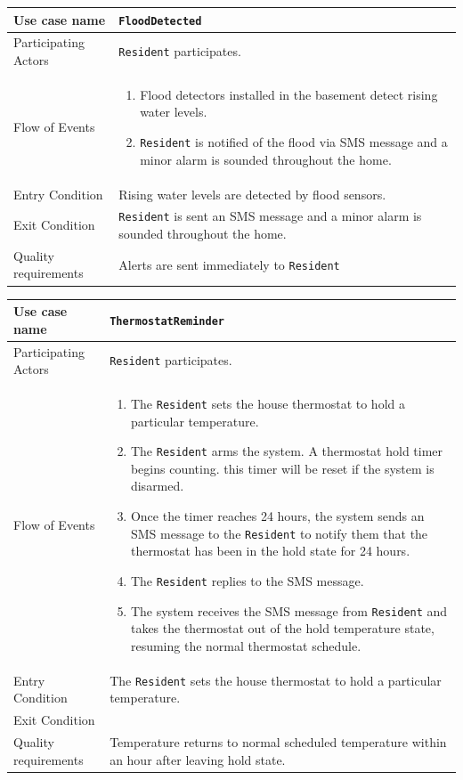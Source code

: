 \documentclass{report}
\begin{document}
\begin{tabular}{| l | p{12cm} |}
\hline
Use case name & \texttt{FloodDetected} \\ \hline
Participating Actors & \texttt{Resident} participates. \\ \hline
Flow of Events & 

\begin{enumerate}
 \item Flood detectors installed in the basement detect rising water levels.
 \item \texttt{Resident} is notified of the flood via SMS message and a minor alarm
       is sounded throughout the home.
\end{enumerate}

\\ \hline

Entry Condition & Rising water levels are detected by flood sensors. \\ \hline
Exit Condition & \texttt{Resident} is sent an SMS message and a minor alarm
                 is sounded throughout the home. \\ \hline
Quality requirements & Alerts are sent immediately to \texttt{Resident} \\ \hline

\hline
\end{tabular}

\begin{tabular}{| l | p{12cm} |}
\hline
Use case name & \texttt{ThermostatReminder} \\ \hline
Participating Actors & \texttt{Resident} participates. \\ \hline
Flow of Events & 

\begin{enumerate}
 \item The \texttt{Resident} sets the house thermostat to hold a particular temperature.
 \item The \texttt{Resident} arms the system. A thermostat hold timer begins counting.
       this timer will be reset if the system is disarmed.
 \item Once the timer reaches 24 hours, the system sends an SMS message to the \texttt{Resident}
       to notify them that the thermostat has been in the hold state for 24 hours.
 \item The \texttt{Resident} replies to the SMS message.
 \item The system receives the SMS message from \texttt{Resident} and takes the thermostat
       out of the hold temperature state, resuming the normal thermostat schedule.
\end{enumerate}

\\ \hline

Entry Condition & The \texttt{Resident} sets the house thermostat to hold a particular
                  temperature. \\ \hline
Exit Condition &   \\ \hline
Quality requirements & Temperature returns to normal scheduled temperature
within an hour after leaving hold state.\\ \hline

\hline
\end{tabular}
\end{document}
